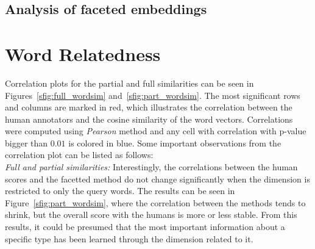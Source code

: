 \subsection{Analysis of faceted embeddings}\label{subsec:exp_faceted}

\section{Word Relatedness}\label{sec:relatedness}
Correlation plots for the partial and full similarities can be seen in Figures~\ref{sfig:full_wordsim} and~\ref{sfig:part_wordsim}. The most significant rows and columns are marked in red, which illustrates the correlation between the human annotators and the cosine similarity of the word vectors. Correlations were computed using \emph{Pearson} method and any cell with correlation with p-value bigger than $0.01$ is colored in blue.
Some important observations from the correlation plot can be listed as follows:\\


\emph{Full and partial similarities:} Interestingly, the correlations between the human scores and the facetted method do not change significantly when the dimension is restricted to only the query words. The results can be seen in Figure~\ref{sfig:part_wordsim}, where the correlation between the methods tends to shrink, but the overall score with the humans is more or less stable. From this results, it could be presumed that the most important information about a specific type has been learned through the dimension related to it. 
\\

